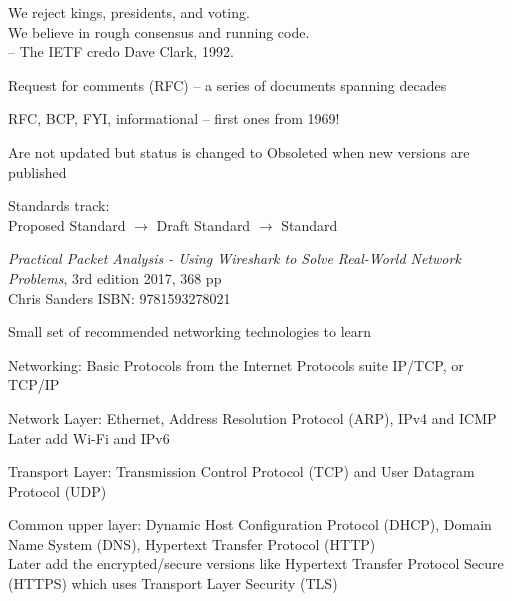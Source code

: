 \documentclass[Screen16to9,17pt]{foils}
\begin{document}

{\hlkbig \color{titlecolor}
We reject kings, presidents, and voting.\\
We believe in rough consensus and running code.\\
-- The IETF credo Dave Clark, 1992.}

\begin{list1}
\item Request for comments (RFC) -- a series of documents spanning decades
\item RFC, BCP, FYI, informational -- first ones from 1969!
\item Are not updated but status is changed to Obsoleted when new versions are published
\item Standards track:\\
Proposed Standard $\rightarrow$ Draft Standard $\rightarrow$ Standard
\end{list1}






\begin{list2}
\item \emph{Practical Packet Analysis - Using Wireshark to Solve Real-World Network Problems}, 3rd edition 2017, 368 pp\\
Chris Sanders ISBN: 9781593278021
\end{list2}





Small set of recommended networking technologies to learn

Networking: Basic Protocols from the Internet Protocols suite IP/TCP, or TCP/IP
\begin{list2}
\item Network Layer: Ethernet, Address Resolution Protocol (ARP), IPv4 and ICMP\\
Later add Wi-Fi and IPv6
\item Transport Layer: Transmission Control Protocol (TCP) and User Datagram Protocol (UDP)
\item Common upper layer: Dynamic Host Configuration Protocol (DHCP), Domain Name System (DNS),
Hypertext Transfer Protocol (HTTP)\\
Later add the encrypted/secure versions like Hypertext Transfer Protocol Secure (HTTPS) which uses Transport Layer Security (TLS)
\end{list2}
\end{document}
